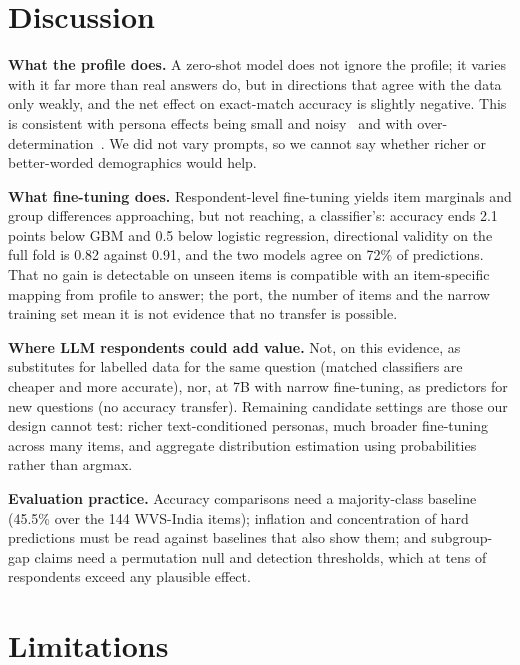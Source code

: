 \documentclass[conference]{IEEEtran}
\begin{document}
\section{Discussion}

\textbf{What the profile does.} A zero-shot model does not ignore the profile; it varies with it far more than real answers do, but in directions that agree with the data only weakly, and the net effect on exact-match accuracy is slightly negative. This is consistent with persona effects being small and noisy~\cite{hu2024} and with over-determination~\cite{chen2026}. We did not vary prompts, so we cannot say whether richer or better-worded demographics would help.

\textbf{What fine-tuning does.} Respondent-level fine-tuning yields item marginals and group differences approaching, but not reaching, a classifier's: accuracy ends 2.1 points below GBM and 0.5 below logistic regression, directional validity on the full fold is 0.82 against 0.91, and the two models agree on 72\% of predictions. That no gain is detectable on unseen items is compatible with an item-specific mapping from profile to answer; the port, the number of items and the narrow training set mean it is not evidence that no transfer is possible.

\textbf{Where LLM respondents could add value.} Not, on this evidence, as substitutes for labelled data for the same question (matched classifiers are cheaper and more accurate), nor, at 7B with narrow fine-tuning, as predictors for new questions (no accuracy transfer). Remaining candidate settings are those our design cannot test: richer text-conditioned personas, much broader fine-tuning across many items, and aggregate distribution estimation using probabilities rather than argmax.

\textbf{Evaluation practice.} Accuracy comparisons need a majority-class baseline (45.5\% over the 144 WVS-India items); inflation and concentration of hard predictions must be read against baselines that also show them; and subgroup-gap claims need a permutation null and detection thresholds, which at tens of respondents exceed any plausible effect.

\section{Limitations}
\end{document}
